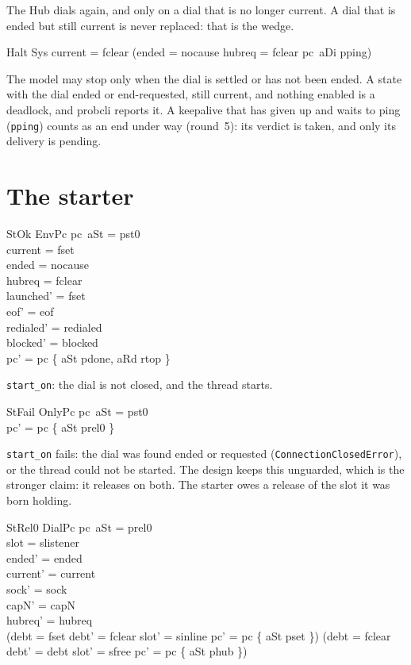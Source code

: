 \documentclass[a4paper,10pt,fleqn]{article}
\begin{document}
The Hub dials again, and only on a dial that is no longer current.  A dial
that is ended but still current is never replaced: that is the wedge.

\begin{schema}{Halt}
  \Xi Sys
\where
  current = fclear \lor
    (ended = nocause \land hubreq = fclear \land pc~aDi \neq pping)
\end{schema}

The model may stop only when the dial is settled or has not been ended.  A
state with the dial ended or end-requested, still current, and nothing enabled
is a deadlock, and probcli reports it.  A keepalive that has given up and waits
to ping (\texttt{pping}) counts as an end under way (round~5): its verdict is
taken, and only its delivery is pending.

\section{The starter}

\begin{schema}{StOk}
  EnvPc
\where
  pc~aSt = pst0 \\
  current = fset \\
  ended = nocause \\
  hubreq = fclear \\
  launched' = fset \\
  eof' = eof \\
  redialed' = redialed \\
  blocked' = blocked \\
  pc' = pc \oplus \{ aSt \mapsto pdone, aRd \mapsto rtop \}
\end{schema}

\texttt{start\_on}: the dial is not closed, and the thread starts.

\begin{schema}{StFail}
  OnlyPc
\where
  pc~aSt = pst0 \\
  pc' = pc \oplus \{ aSt \mapsto prel0 \}
\end{schema}

\texttt{start\_on} fails: the dial was found ended or requested
(\texttt{ConnectionClosedError}), or the thread could not be started.  The
design keeps this unguarded, which is the stronger claim: it releases on both.
The starter owes a release of the slot it was born holding.

\begin{schema}{StRel0}
  DialPc
\where
  pc~aSt = prel0 \\
  slot = slistener \\
  ended' = ended \\
  current' = current \\
  sock' = sock \\
  capN' = capN \\
  hubreq' = hubreq \\
  (debt = fset \land debt' = fclear \land slot' = sinline \land
    pc' = pc \oplus \{ aSt \mapsto pset \}) \lor
  (debt = fclear \land debt' = debt \land slot' = sfree \land
    pc' = pc \oplus \{ aSt \mapsto phub \})
\end{schema}
\end{document}
